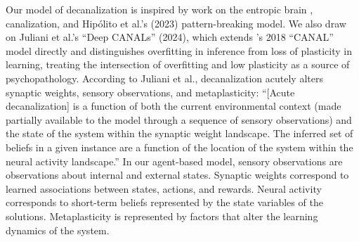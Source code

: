 \documentclass[12pt,fleqn]{article}
\begin{document}
Our model of decanalization is inspired by work on the entropic brain \cite{carhart-harris_entropic_2014,carhart-harris_entropic_2018}, canalization, and Hipólito et al.'s (2023) pattern-breaking model. We also draw on Juliani et al.'s “Deep CANALs” (2024), which extends \cite{carhart-harris_entropic_2018}'s 2018 ``CANAL'' model directly and distinguishes overfitting in inference from loss of plasticity in learning, treating the intersection of overfitting and low plasticity as a source of psychopathology. According to Juliani et al., decanalization acutely alters synaptic weights, sensory observations, and metaplasticity: “[Acute decanalization] is a function of both the current environmental context (made partially available to the model through a sequence of sensory observations) and the state of the system within the synaptic weight landscape. The inferred set of beliefs in a given instance are a function of the location of the system within the neural activity landscape.” In our agent-based model, sensory observations are observations about internal and external states. Synaptic weights correspond to learned associations between states, actions, and rewards. Neural activity corresponds to short-term beliefs represented by the state variables of the solutions. Metaplasticity is represented by factors that alter the learning dynamics of the system.
\end{document}
